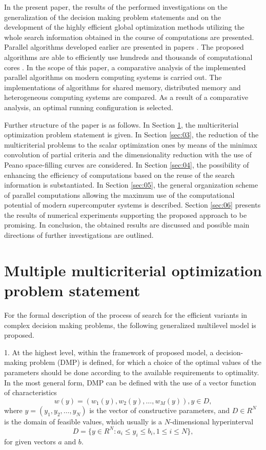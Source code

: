 \documentclass{svproc}
\begin{document}
In the present paper, the results of the performed investigations on the generalization of the decision making problem statements \cite{x11,x12} and on the development of the highly efficient global optimization methods utilizing the whole search information obtained in the course of computations \cite{x13,x14,x15,x16,x17} are presented. Parallel algorithms developed earlier are presented in papers \cite{x14,x15,x16,x17}. The proposed algorithms are able to efficiently use hundreds and thousands of computational cores \cite{x17_1}. In the scope of this paper, a comparative analysis of the implemented parallel algorithms on modern computing systems is carried out. The implementations of algorithms for shared memory, distributed memory and heterogeneous computing systems are compared. As a result of a comparative analysis, an optimal running configuration is selected.

Further structure of the paper is as follows. In Section \ref{sec:02}, the multicriterial optimization problem statement is given. In Section \ref{sec:03}, the reduction of the multicriterial problems to the scalar optimization ones by means of the minimax convolution of partial criteria and the dimensionality reduction with the use of Peano space-filling curves are considered. In Section \ref{sec:04}, the possibility of enhancing the efficiency of computations based on the reuse of the search information is substantiated. In Section \ref{sec:05}, the general organization scheme of parallel computations allowing the maximum use of the computational potential of modern supercomputer systems is described. Section \ref{sec:06} presents the results of numerical experiments supporting the proposed approach to be promising. In conclusion, the obtained results are discussed and possible main directions of further investigations are outlined.


\section{Multiple multicriterial optimization problem statement}
\label{sec:02}
For the formal description of the process of search for the efficient variants in complex decision making problems, the following generalized multilevel model is proposed.

1. At the highest level, within the framework of proposed model, a decision-making problem (DMP) is defined, for which a choice of the optimal values of the parameters should be done according to the available requirements to optimality. In the most general form, DMP can be defined with the use of a vector function of characteristics 
\begin{equation}
\label{eq:01}
w(y)=(w_1(y), w_2(y), \dots, w_M(y)), y \in D,
\end{equation}
where $y=(y_1,y_2, \dots ,y_N)$ is the vector of constructive parameters, and $D \in R^N$ is the domain of feasible values, which usually is a $N$-dimensional hyperinterval
\begin{equation}
\label{eq:02}
D=\{ y\in R^N : a_i \leq y_i \leq b_i,1 \leq i \leq N \},
\end{equation}
for given vectors $a$ and $b$. 
\end{document}
